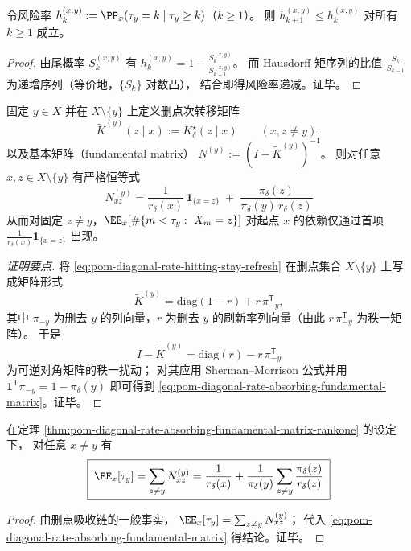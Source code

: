 \begin{corollary}[递减风险率]\label{cor:pom-diagonal-rate-absorbing-dfr}
令风险率
\(
h_k^{(x,y)}:=\PP_x(\tau_y=k\mid \tau_y\ge k)
\)（\(k\ge 1\)）。
则 \(h_{k+1}^{(x,y)}\le h_k^{(x,y)}\) 对所有 \(k\ge 1\) 成立。
\end{corollary}
\begin{proof}
由尾概率 \(S_k^{(x,y)}\) 有 \(h_k^{(x,y)}=1-\frac{S_k^{(x,y)}}{S_{k-1}^{(x,y)}}\)。
而 Hausdorff 矩序列的比值 \(\frac{S_k}{S_{k-1}}\) 为递增序列（等价地，\(\{S_k\}\) 对数凸），
结合即得风险率递减。证毕。
\end{proof}

\begin{theorem}[删点基本矩阵的秩一闭式]\label{thm:pom-diagonal-rate-absorbing-fundamental-matrix-rankone}
固定 \(y\in X\) 并在 \(X\setminus\{y\}\) 上定义删点次转移矩阵
\[
\widetilde K^{(y)}(z\mid x):=K^\star_\delta(z\mid x)\qquad(x,z\ne y),
\]
以及基本矩阵（fundamental matrix）
\(
N^{(y)}:=(I-\widetilde K^{(y)})^{-1}
\)。
则对任意 \(x,z\in X\setminus\{y\}\) 有严格恒等式
\begin{equation}\label{eq:pom-diagonal-rate-absorbing-fundamental-matrix}
\boxed{\;
N^{(y)}_{xz}
=\frac{1}{r_\delta(x)}\,\mathbf 1_{\{x=z\}}
\;+\;
\frac{\pi_\delta(z)}{\pi_\delta(y)\,r_\delta(z)}\;}
\end{equation}
从而对固定 \(z\ne y\)，\(\EE_x[\#\{m<\tau_y:\ X_m=z\}]\) 对起点 \(x\) 的依赖仅通过首项 \(\frac{1}{r_\delta(x)}\mathbf 1_{\{x=z\}}\) 出现。
\end{theorem}
\begin{proof}[证明要点]
将 \eqref{eq:pom-diagonal-rate-hitting-stay-refresh} 在删点集合 \(X\setminus\{y\}\) 上写成矩阵形式
\[
\widetilde K^{(y)}=\mathrm{diag}(1-r)+r\,\pi_{-y}^{\mathsf T},
\]
其中 \(\pi_{-y}\) 为删去 \(y\) 的列向量，\(r\) 为删去 \(y\) 的刷新率列向量（由此 \(r\,\pi_{-y}^{\mathsf T}\) 为秩一矩阵）。
于是
\[
I-\widetilde K^{(y)}=\mathrm{diag}(r)-r\,\pi_{-y}^{\mathsf T}
\]
为可逆对角矩阵的秩一扰动；
对其应用 Sherman--Morrison 公式并用
\(
\mathbf{1}^{\mathsf T}\pi_{-y}=1-\pi_\delta(y)
\)
即可得到 \eqref{eq:pom-diagonal-rate-absorbing-fundamental-matrix}。证毕。
\end{proof}

\begin{corollary}[命中时均值的闭式]\label{cor:pom-diagonal-rate-absorbing-mean-hit-time}
在定理 \ref{thm:pom-diagonal-rate-absorbing-fundamental-matrix-rankone} 的设定下，
对任意 \(x\ne y\) 有
\[
\boxed{\;
\EE_x[\tau_y]
=\sum_{z\ne y}N^{(y)}_{xz}
=\frac{1}{r_\delta(x)}+\frac{1}{\pi_\delta(y)}\sum_{z\ne y}\frac{\pi_\delta(z)}{r_\delta(z)}\;}
\]
\end{corollary}
\begin{proof}
由删点吸收链的一般事实，
\(
\EE_x[\tau_y]=\sum_{z\ne y}N^{(y)}_{xz}
\)；
代入 \eqref{eq:pom-diagonal-rate-absorbing-fundamental-matrix} 得结论。证毕。
\end{proof}

